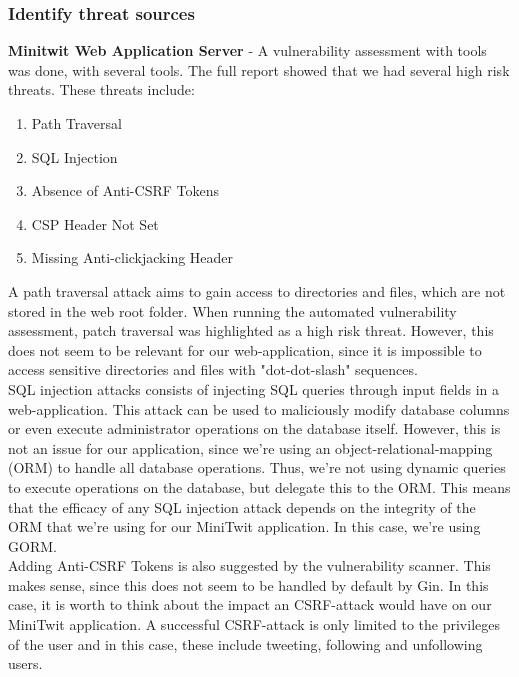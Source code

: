 \subsubsection{Identify threat sources}
\textbf{Minitwit Web Application Server} - A vulnerability assessment with tools was done, with several tools. The full report\cite{security_assesment_report} showed that we had several high risk threats. These threats include: 

\begin{enumerate}
    \item Path Traversal
    \item SQL Injection
    \item Absence of Anti-CSRF Tokens
    \item CSP Header Not Set
    \item Missing Anti-clickjacking Header
\end{enumerate}

A path traversal attack aims to gain access to directories and files, which are not stored in the web root folder\cite{owasp_path_traversal}. When running the automated vulnerability assessment, patch traversal was highlighted as a high risk threat. However, this does not seem to be relevant for our web-application, since it is impossible to access sensitive directories and files with "dot-dot-slash" sequences.\\

SQL injection attacks consists of injecting SQL queries through input fields in a web-application\cite{owasp_sql_injection}. This attack can be used to maliciously modify database columns or even execute administrator operations on the database itself. However, this is not an issue for our application, since we're using an object-relational-mapping (ORM) to handle all database operations. Thus, we're not using dynamic queries to execute operations on the database, but delegate this to the ORM. This means that the efficacy of any SQL injection attack depends on the integrity of the ORM that we're using for our MiniTwit application. In this case, we're using GORM.\cite{gorm}\\

Adding Anti-CSRF Tokens is also suggested by the vulnerability scanner. This makes sense, since this does not seem to be handled by default by Gin. In this case, it is worth to think about the impact an CSRF-attack would have on our MiniTwit application. A successful CSRF-attack is only limited to the privileges of the user and in this case, these include tweeting, following and unfollowing users. 





